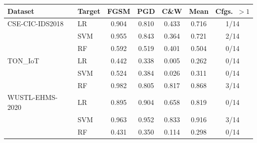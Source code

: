 \begin{tabular}{l l c c c c c}
\toprule
\textbf{Dataset} & \textbf{Target} & \textbf{FGSM} & \textbf{PGD} & \textbf{C\&W} & \textbf{Mean} & \textbf{Cfgs.\ $>1$} \\
\midrule
CSE-CIC-IDS2018 & LR & 0.904 & 0.810 & 0.433 & 0.716 & 1/14 \\
 & SVM & 0.955 & 0.843 & 0.364 & 0.721 & 2/14 \\
 & RF & 0.592 & 0.519 & 0.401 & 0.504 & 0/14 \\
TON\_IoT & LR & 0.442 & 0.338 & 0.005 & 0.262 & 0/14 \\
 & SVM & 0.524 & 0.384 & 0.026 & 0.311 & 0/14 \\
 & RF & 0.982 & 0.805 & 0.817 & 0.868 & 3/14 \\
WUSTL-EHMS-2020 & LR & 0.895 & 0.904 & 0.658 & 0.819 & 0/14 \\
 & SVM & 0.963 & 0.952 & 0.833 & 0.916 & 3/14 \\
 & RF & 0.431 & 0.350 & 0.114 & 0.298 & 0/14 \\
\bottomrule
\end{tabular}